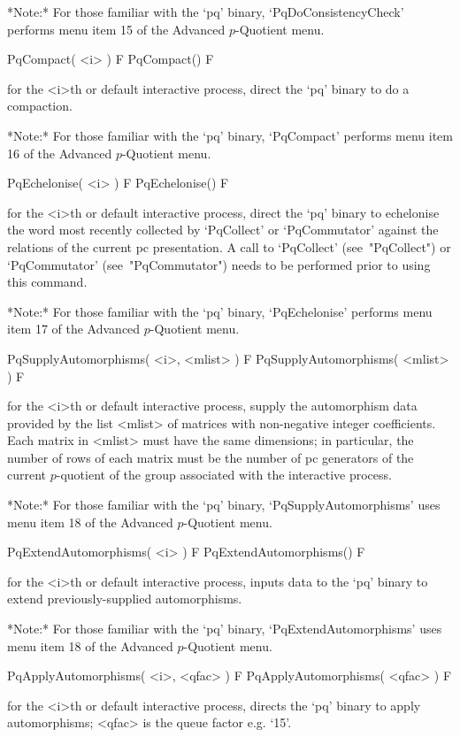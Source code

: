 *Note:*
For those familiar with the `pq' binary, `PqDoConsistencyCheck'  performs
menu item 15 of the Advanced $p$-Quotient menu.

\>PqCompact( <i> ) F
\>PqCompact() F

for the <i>th or default interactive {\ANUPQ} process, direct  the  `pq'
binary to do a compaction.

*Note:*
For those familiar with the `pq' binary, `PqCompact' performs  menu  item
16 of the Advanced $p$-Quotient menu.

\>PqEchelonise( <i> ) F
\>PqEchelonise() F

for the <i>th or default interactive {\ANUPQ} process,  direct  the  `pq'
binary to echelonise the word most recently collected by  `PqCollect'  or
`PqCommutator' against the relations of the current  pc  presentation.  A
call    to    `PqCollect'     (see~"PqCollect")     or     `PqCommutator'
(see~"PqCommutator") needs to be performed prior to using this command.

*Note:*
For those familiar with the `pq'  binary,  `PqEchelonise'  performs  menu
item 17 of the Advanced $p$-Quotient menu.

\>PqSupplyAutomorphisms( <i>, <mlist> ) F
\>PqSupplyAutomorphisms( <mlist> ) F

for the  <i>th  or  default  interactive  {\ANUPQ}  process,  supply  the
automorphism  data  provided  by  the  list  <mlist>  of  matrices   with
non-negative integer coefficients. Each matrix in <mlist> must  have  the
same dimensions; in particular, the number of rows of each matrix must be
the number of pc generators of the  current  $p$-quotient  of  the  group
associated with the interactive {\ANUPQ} process.

*Note:* 
For those familiar with the  `pq'  binary,  `PqSupplyAutomorphisms'  uses
menu item 18 of the Advanced $p$-Quotient menu.

\>PqExtendAutomorphisms( <i> ) F
\>PqExtendAutomorphisms() F

for the <i>th or default interactive {\ANUPQ} process, inputs data to the
`pq' binary to extend previously-supplied automorphisms.

*Note:*
For those familiar with the  `pq'  binary,  `PqExtendAutomorphisms'  uses
menu item 18 of the Advanced $p$-Quotient menu.

\>PqApplyAutomorphisms( <i>, <qfac> ) F
\>PqApplyAutomorphisms( <qfac> ) F

for the <i>th or default interactive {\ANUPQ} process, directs  the  `pq'
binary to apply automorphisms; <qfac> is the queue factor e.g. `15'.

